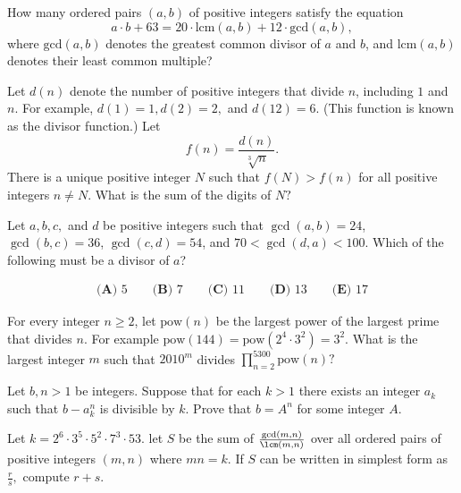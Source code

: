 \documentclass[mast]{lucky}
\begin{document}
\begin{prob}[AMC 10B 2018/23]{6}
How many ordered pairs $(a, b)$ of positive integers satisfy the equation\[a\cdot b + 63 = 20\cdot \text{lcm}(a, b) + 12\cdot\text{gcd}(a,b),\]where $\text{gcd}(a,b)$ denotes the greatest common divisor of $a$ and $b$, and $\text{lcm}(a,b)$ denotes their least common multiple?
\end{prob}

\begin{req}[AMC 12A 2021/25]{9}
Let $d(n)$ denote the number of positive integers that divide $n$, including $1$ and $n$. For example, $d(1)=1,d(2)=2,$ and $d(12)=6$. (This function is known as the divisor function.) Let \[f(n)=\frac{d(n)}{\sqrt[3]{n}}.\]There is a unique positive integer $N$ such that $f(N)>f(n)$ for all positive integers $n\ne N$. What is the sum of the digits of $N?$
\end{req}

\begin{prob}[AMC 10A 2018/22]{9}
Let $a, b, c,$ and $d$ be positive integers such that $\gcd(a, b)=24$, $\gcd(b, c)=36$, $\gcd(c, d)=54$, and $70<\gcd(d, a)<100$. Which of the following must be a divisor of $a$?

\begin{align*}\textbf{(A)} \text{ 5} \qquad \textbf{(B)} \text{ 7} \qquad \textbf{(C)} \text{ 11} \qquad \textbf{(D)} \text{ 13} \qquad \textbf{(E)} \text{ 17}\end{align*}
\end{prob}

\begin{prob}[AMC 12B 2010/25]{9}
For every integer $n\ge2$, let $\text{pow}(n)$ be the largest power of the largest prime that divides $n$. For example $\text{pow}(144)=\text{pow}(2^4\cdot3^2)=3^2$. What is the largest integer $m$ such that $2010^m$ divides $\prod\limits_{n=2}^{5300}\text{pow}(n)?$
\end{prob}

\begin{prob}[ISL 2007/N2]{13}
Let $b,n > 1$ be integers. Suppose that for each $k > 1$ there exists an integer $a_k$ such that $b - a^n_k$ is divisible by $k$. Prove that $b = A^n$ for some integer $A$.
\end{prob}

\begin{prob}[PUMaC 2016]{13}
Let $k=2^6\cdot 3^5\cdot 5^2\cdot 7^3\cdot 53.$ let $S$ be the sum of $\frac{\gcd(m,n)}{\lcm(m,n)}$ over all ordered pairs of positive integers $(m,n)$ where $mn=k.$ If $S$ can be written in simplest form as $\frac{r}{s},$ compute $r+s.$
\end{prob}
\end{document}
